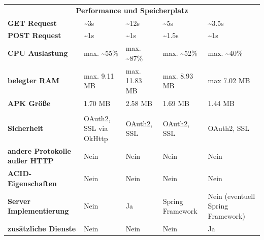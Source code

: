 \begin{landscape}
\begin{longtable}{m{3.5cm}|m{4.5cm}|m{4.5cm}|m{4.5cm}|m{4.5cm}}
	  \multicolumn{5}{c}{\textbf{Performance und Speicherplatz}} \\ \hhline{=====}
	  
	  \textbf{GET Request} & \textasciitilde3s & \textasciitilde12s  & \textasciitilde5s & \textasciitilde3.5s\\ \hline
	  
	  \textbf{POST Request} & \textasciitilde1s &  \textasciitilde1s & \textasciitilde1.5s & \textasciitilde1s \\ \hline
	  
	  \textbf{CPU Auslastung} & max. \textasciitilde55\%  & max. \textasciitilde87\% & max. \textasciitilde52\% & max. \textasciitilde40\%\\ \hline
	  \textbf{belegter RAM} & max. 9.11 MB & max. 11.83 MB & max. 8.93 MB & max 7.02 MB \\ \hline
	  \textbf{APK Größe} & 1.70 MB & 2.58 MB & 1.69 MB & 1.44 MB \\ \hhline{=====}

	   \multicolumn{5}{c}{\textbf{Erweiterte Technische Fähigkeiten}} \\ \hhline{=====}
	   
	   \textbf{Sicherheit} & OAuth2, SSL via OkHttp & OAuth2, SSL & OAuth2, SSL & OAuth2, SSL \\ \hline
	   \textbf{andere Protokolle außer HTTP} &  Nein & Nein & Nein & Nein\\ \hline	   
	   \textbf{ACID-Eigenschaften} & Nein & Nein & Nein & Nein \\ \hline
	   \textbf{Server Implementierung} & Nein & Ja &  Spring Framework & Nein (eventuell Spring Framework) \\ \hline
	   \textbf{zusätzliche Dienste} & Nein & Nein & Nein & Ja \\ \hline
 
\end{longtable}
\end{landscape}

